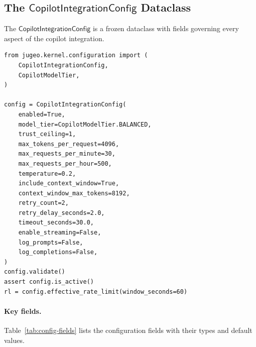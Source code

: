 \documentclass[11pt]{article}
\newcommand{\CIC}{\mathsf{CopilotIntegrationConfig}}
\begin{document}
\subsection{The \texorpdfstring{$\CIC$}{CopilotIntegrationConfig}
  Dataclass}
\label{sec:config}

The $\CIC$ is a frozen dataclass with
fields governing every aspect of the
copilot integration.

\begin{lstlisting}[style=jugeo-python, caption={Creating and
  validating a $\CIC$.}]
from jugeo.kernel.configuration import (
    CopilotIntegrationConfig,
    CopilotModelTier,
)

config = CopilotIntegrationConfig(
    enabled=True,
    model_tier=CopilotModelTier.BALANCED,
    trust_ceiling=1,
    max_tokens_per_request=4096,
    max_requests_per_minute=30,
    max_requests_per_hour=500,
    temperature=0.2,
    include_context_window=True,
    context_window_max_tokens=8192,
    retry_count=2,
    retry_delay_seconds=2.0,
    timeout_seconds=30.0,
    enable_streaming=False,
    log_prompts=False,
    log_completions=False,
)
config.validate()
assert config.is_active()
rl = config.effective_rate_limit(window_seconds=60)
\end{lstlisting}

\paragraph{Key fields.}
Table~\ref{tab:config-fields} lists the configuration
fields with their types and default values.
\end{document}
